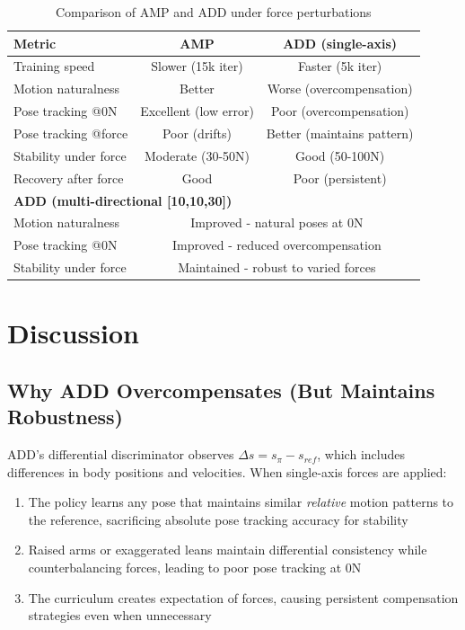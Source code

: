 \documentclass{article}
\begin{document}
\begin{table}[t]
\centering
\caption{Comparison of AMP and ADD under force perturbations}
\label{tab:comparison}
\begin{tabular}{lcc}
\toprule
\textbf{Metric} & \textbf{AMP} & \textbf{ADD (single-axis)} \\
\midrule
Training speed & Slower (15k iter) & Faster (5k iter) \\
Motion naturalness & Better & Worse (overcompensation) \\
Pose tracking @0N & Excellent (low error) & Poor (overcompensation) \\
Pose tracking @force & Poor (drifts) & Better (maintains pattern) \\
Stability under force & Moderate (30-50N) & Good (50-100N) \\
Recovery after force & Good & Poor (persistent) \\
\midrule
\multicolumn{3}{l}{\textbf{ADD (multi-directional [10,10,30])}} \\
Motion naturalness & \multicolumn{2}{c}{Improved - natural poses at 0N} \\
Pose tracking @0N & \multicolumn{2}{c}{Improved - reduced overcompensation} \\
Stability under force & \multicolumn{2}{c}{Maintained - robust to varied forces} \\
\bottomrule
\end{tabular}
\end{table}

\section{Discussion}

\subsection{Why ADD Overcompensates (But Maintains Robustness)}

ADD's differential discriminator observes $\Delta s = s_\pi - s_{ref}$, which includes differences in body positions and velocities. When single-axis forces are applied:

\begin{enumerate}
\item The policy learns any pose that maintains similar \emph{relative} motion patterns to the reference, sacrificing absolute pose tracking accuracy for stability
\item Raised arms or exaggerated leans maintain differential consistency while counterbalancing forces, leading to poor pose tracking at 0N
\item The curriculum creates expectation of forces, causing persistent compensation strategies even when unnecessary
\end{enumerate}
\end{document}
